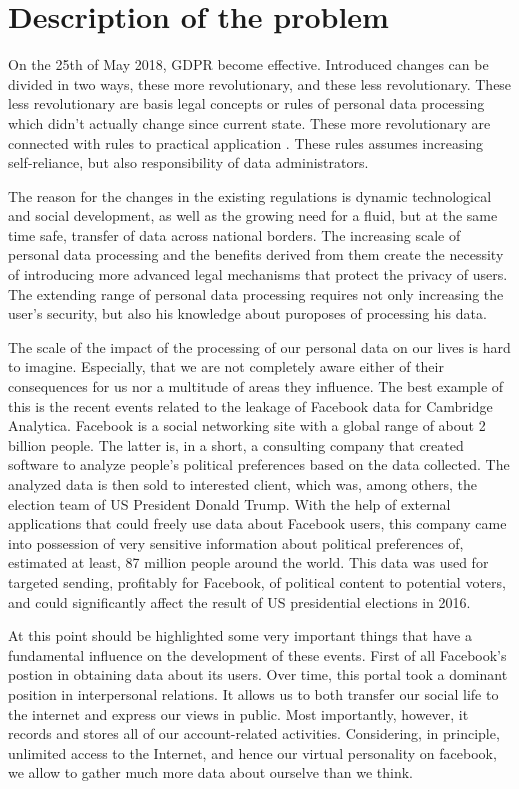\documentclass[en, noamssymb]{mgr}
\begin{document}
\section{Description of the problem}

On the 25th of May 2018, GDPR become effective. Introduced changes can be divided in two ways, these more revolutionary, and these less revolutionary. These less revolutionary are basis legal concepts or rules of personal data processing which didn't actually change since current state. These more revolutionary are connected with rules to practical application \cite{giodo}. These rules assumes increasing self-reliance, but also responsibility of data administrators.

\indent The reason for the changes in the existing 	regulations is dynamic technological and social development, as well as the growing need for a fluid, but at the same time safe, transfer of data across national borders. The increasing scale of personal data processing and the benefits derived from them create the necessity of introducing more advanced legal mechanisms that protect the privacy of users. The extending range of personal data processing requires not only increasing the user's security, but also his knowledge about puroposes of processing his data.

The scale of the impact of the processing of our personal data on our lives is hard to imagine. Especially, that we are not completely aware either of their consequences for us nor a multitude of areas they influence. The best example of this is the recent events related to the leakage of Facebook data for Cambridge Analytica. Facebook is a social networking site with a global range of about 2 billion people. The latter is, in a short, a consulting company that created software to analyze people's political preferences based on the data collected. The analyzed data is then sold to interested client, which was, among others, the election team of US President Donald Trump. With the help of external applications that could freely use data about Facebook users, this company came into possession of very sensitive information about political preferences of, estimated at least, 87 million people around the world. This data was used for targeted sending, profitably for Facebook, of political content to potential voters, and could significantly affect the result of US presidential elections in 2016.

\indent At this point should be highlighted some very important things that have a fundamental influence on the development of these events. First of all Facebook's postion in obtaining data about its users. Over time, this portal took a dominant position in interpersonal relations. It allows us to both transfer our social life to the internet and express our views in public. Most importantly, however, it records and stores all of our account-related activities. Considering, in principle, unlimited access to the Internet, and hence our virtual personality on facebook, we allow to gather much more data about ourselve than we think. 
\end{document}
